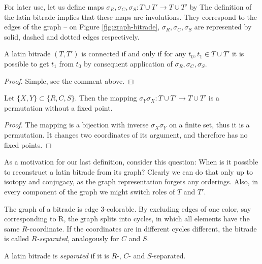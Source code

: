 \noindent
For later use, let us define maps $\sigma_R, \sigma_C, \sigma_S : T \cup T' \rightarrow T \cup T'$ by
%
The definition of the latin bitrade implies that these maps are involutions. They correspond to the edges of the graph -- on Figure \ref{fig:graph-bitrade},  $\sigma_R, \sigma_C, \sigma_S$ are represented by solid, dashed and dotted edges respectively.

\begin{lem}
\label{lem:connected-sigma}
A latin bitrade $(T,T')$ is connected if and only if for any $t_0,t_1 \in T \cup T'$ it is possible to get $t_1$ from $t_0$ by consequent application of $\sigma_R, \sigma_C, \sigma_S$.
\end{lem}
\begin{proof}
Simple, see the comment above.
\end{proof}

\begin{lem}
\label{lem:sigma-cycles}
Let $\{X,Y\} \subset \{R,C,S\}$. Then the mapping $\sigma_Y\sigma_X : T \cup T' \rightarrow T \cup T'$ is a permutation without a fixed point.
\end{lem}
\begin{proof}
The mapping is a bijection with inverse $\sigma_X\sigma_Y$ on a finite set, thus it is a permutation. It changes two coordinates of its argument, and therefore has no fixed points.
\end{proof}

As a motivation for our last definition, consider this question: When is it possible to reconstruct a latin bitrade from its graph? Clearly we can do that only up to isotopy and conjugacy, as the graph representation forgets any orderings. Also, in every component of the graph we might switch roles of $T$ and $T'$.

The graph of a bitrade is edge 3-colorable. By excluding edges of one color, say corresponding to  R, the graph splits into cycles, in which all elements have the same $R$-coordinate. If the coordinates are in different cycles different, the bitrade is called \emph{$R$-separated}, analogously for $C$ and $S$.

\begin{defn}
 A latin bitrade is \emph{separated} if it is $R$-, $C$- and $S$-separated.
\end{defn}

